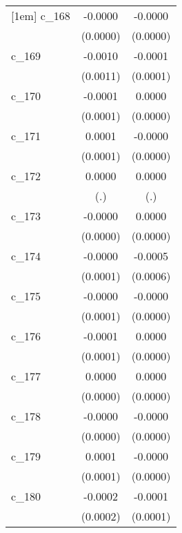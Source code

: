 {\begin{tabular}{l*{2}{c}}
[1em]
c\_168       &     -0.0000        &     -0.0000        \\
            &    (0.0000)        &    (0.0000)        \\
[1em]
c\_169       &     -0.0010        &     -0.0001        \\
            &    (0.0011)        &    (0.0001)        \\
[1em]
c\_170       &     -0.0001        &      0.0000        \\
            &    (0.0001)        &    (0.0000)        \\
[1em]
c\_171       &      0.0001        &     -0.0000        \\
            &    (0.0001)        &    (0.0000)        \\
[1em]
c\_172       &      0.0000        &      0.0000        \\
            &         (.)        &         (.)        \\
[1em]
c\_173       &     -0.0000        &      0.0000        \\
            &    (0.0000)        &    (0.0000)        \\
[1em]
c\_174       &     -0.0000        &     -0.0005        \\
            &    (0.0001)        &    (0.0006)        \\
[1em]
c\_175       &     -0.0000        &     -0.0000        \\
            &    (0.0001)        &    (0.0000)        \\
[1em]
c\_176       &     -0.0001        &      0.0000        \\
            &    (0.0001)        &    (0.0000)        \\
[1em]
c\_177       &      0.0000        &      0.0000        \\
            &    (0.0000)        &    (0.0000)        \\
[1em]
c\_178       &     -0.0000        &     -0.0000        \\
            &    (0.0000)        &    (0.0000)        \\
[1em]
c\_179       &      0.0001        &     -0.0000        \\
            &    (0.0001)        &    (0.0000)        \\
[1em]
c\_180       &     -0.0002        &     -0.0001        \\
            &    (0.0002)        &    (0.0001)        \\

\end{tabular}}
